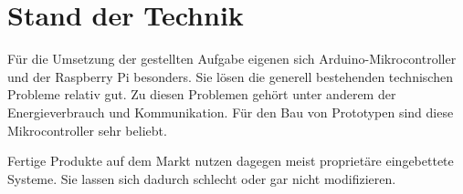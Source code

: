 \section{Stand der Technik}
Für die Umsetzung der gestellten Aufgabe eigenen sich Arduino-Mikrocontroller und der Raspberry Pi besonders. Sie lösen die generell bestehenden technischen Probleme relativ gut. Zu diesen Problemen gehört unter anderem der Energieverbrauch und Kommunikation. Für den Bau von Prototypen sind diese Mikrocontroller sehr beliebt. 

Fertige Produkte auf dem Markt nutzen dagegen meist proprietäre eingebettete Systeme. Sie lassen sich dadurch schlecht oder gar nicht modifizieren.   
